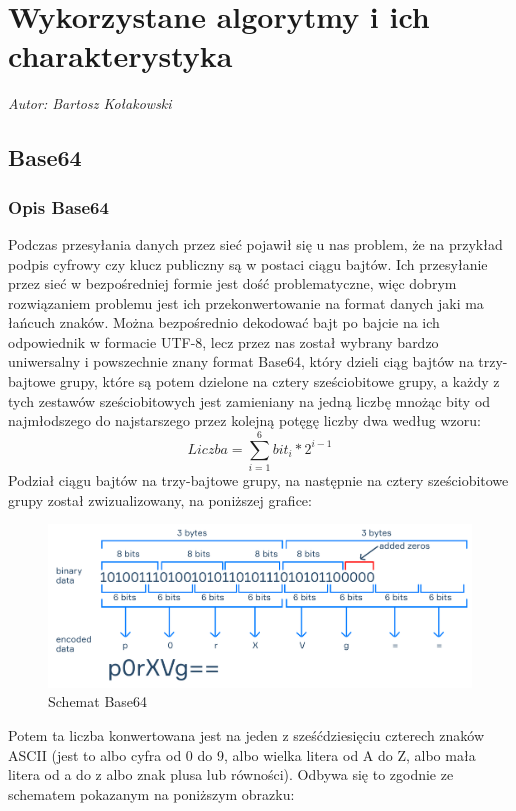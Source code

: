 \chapter{Wykorzystane algorytmy i ich charakterystyka}
\textit{Autor: Bartosz Kołakowski}
\setlength{\parindent}{0pt}
\section{Base64}
\subsection{Opis Base64}
Podczas przesyłania danych przez sieć pojawił się u nas problem, że na przykład podpis cyfrowy czy klucz publiczny są w postaci ciągu bajtów. Ich przesyłanie przez sieć w bezpośredniej formie jest dość problematyczne, więc dobrym rozwiązaniem problemu jest ich przekonwertowanie na format danych jaki ma łańcuch znaków. Można bezpośrednio dekodować bajt po bajcie na ich odpowiednik w formacie UTF-8, lecz przez nas został wybrany bardzo uniwersalny i powszechnie znany format Base64, który dzieli ciąg bajtów na trzy-bajtowe grupy, które są potem dzielone na cztery sześciobitowe grupy, a każdy z tych zestawów sześciobitowych jest zamieniany na jedną liczbę mnożąc bity od najmłodszego do najstarszego przez kolejną potęgę liczby dwa według wzoru:
\begin{equation}
    Liczba = \sum_{i=1}^6 bit_i * 2^{i-1}
\end{equation}
Podział ciągu bajtów na trzy-bajtowe grupy, na następnie na cztery sześciobitowe grupy został zwizualizowany, na poniższej grafice:
\begin{figure}[H]
    \centering
    \includegraphics[width=\textwidth]{Images/Base64Schema.png}
    \caption{Schemat Base64}
	\label{fig:Base64Schema}
\end{figure}
Potem ta liczba konwertowana jest na jeden z sześćdziesięciu czterech znaków ASCII (jest to albo cyfra od 0 do 9, albo wielka litera od A do Z, albo mała litera od a do z albo znak plusa lub równości). Odbywa się to zgodnie ze schematem pokazanym na poniższym obrazku:
